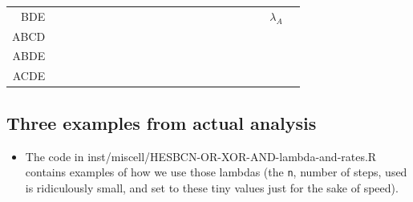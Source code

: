 \documentclass[a4paper,11pt]{article}
\begin{document}
\begin{landscape}
\begin{table}[ht]
\begin{tabular}{rlllllllllllllllllllll}
  BDE &  &  &  &  &  &  &  &  &  &  &  &  &  &  &  &  &  &  &  & $\lambda_A$ &  \\ 
  ABCD &  &  &  &  &  &  &  &  &  &  &  &  &  &  &  &  &  &  &  &  &  \\ 
  ABDE &  &  &  &  &  &  &  &  &  &  &  &  &  &  &  &  &  &  &  &  &  \\ 
  ACDE &  &  &  &  &  &  &  &  &  &  &  &  &  &  &  &  &  &  &  &  &  \\ 
   \hline
\end{tabular}
\end{table}
 \end{landscape}


\subsection{Three examples from actual analysis}
\label{sec:orgdc3f991}
\begin{itemize}
\item The code in inst/miscell/HESBCN-OR-XOR-AND-lambda-and-rates.R contains examples of how we use those lambdas (the \texttt{n}, number of steps, used is ridiculously small, and set to these tiny values just for the sake of speed).
\end{itemize}
\end{document}
